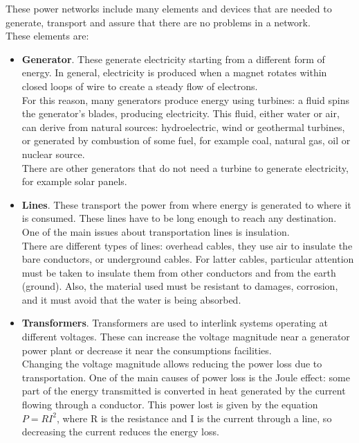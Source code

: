 \noindent These power networks include many elements and devices that are needed to generate, transport and assure that there are no problems in a network.\\
These elements are: \label{networkeledesc}
\begin{itemize}
    \item \textbf{Generator}. These generate electricity starting from a different form of energy. In general, electricity is produced when a magnet rotates within closed loops of wire to create a steady flow of electrons.\\
    For this reason, many generators produce energy using turbines: a fluid spins the generator's blades, producing electricity. This fluid, either water or air, can derive from natural sources: hydroelectric, wind or geothermal turbines, or generated by combustion of some fuel, for example coal, natural gas, oil or nuclear source. \\
    There are other generators that do not need a turbine to generate electricity, for example solar panels.
    
    \item \textbf{Lines}. These transport the power from where energy is generated to where it is consumed. These lines have to be long enough to reach any destination. One of the main issues about transportation lines is insulation. \\
    There are different types of lines: overhead cables, they use air to insulate the bare conductors, or underground cables. For latter cables, particular attention must be taken to insulate them from other conductors and from the earth (ground). Also, the material used must be resistant to damages, corrosion, and it must avoid that the water is being absorbed.
    
    \item \textbf{Transformers}. Transformers are used to interlink systems operating at different voltages. These can increase  the voltage magnitude near a generator power plant or decrease it near the consumptions facilities. \\
    Changing the voltage magnitude allows reducing the power loss due to transportation. One of the main causes of power loss is the Joule effect: some part of the energy transmitted is converted in heat generated by the current flowing through a conductor. This power lost is given by the equation $P=RI^2$, where \gls{R} is the resistance and \gls{I} is the current through a line, so decreasing the current reduces the energy loss.
    

\end{itemize}
